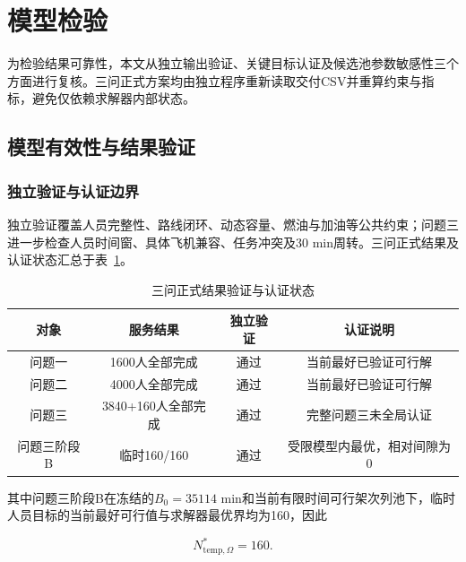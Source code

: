 
\section{模型检验}\label{sec:validation}

为检验结果可靠性，本文从独立输出验证、关键目标认证及候选池参数敏感性三个方面进行复核。三问正式方案均由独立程序重新读取交付CSV并重算约束与指标，避免仅依赖求解器内部状态。

\subsection{模型有效性与结果验证}\label{subsec:validation-results}

\subsubsection{独立验证与认证边界}

独立验证覆盖人员完整性、路线闭环、动态容量、燃油与加油等公共约束；问题三进一步检查人员时间窗、具体飞机兼容、任务冲突及30 min周转。三问正式结果及认证状态汇总于表~\ref{tab:validation-summary}。

\begin{table}[htbp]
\centering
\caption{三问正式结果验证与认证状态}
\label{tab:validation-summary}
\small
\begin{tabular}{c c c c}
\toprule
对象 & 服务结果 & 独立验证 & 认证说明\\
\midrule
问题一 & 1600人全部完成 & 通过 & 当前最好已验证可行解\\
问题二 & 4000人全部完成 & 通过 & 当前最好已验证可行解\\
问题三 & 3840+160人全部完成 & 通过 & 完整问题三未全局认证\\
问题三阶段B & 临时160/160 & 通过 & 受限模型内最优，相对间隙为0\\
\bottomrule
\end{tabular}
\end{table}

其中问题三阶段B在冻结的$B_0=35114$ min和当前有限时间可行架次列池下，临时人员目标的当前最好可行值与求解器最优界均为160，因此

\[
N_{\mathrm{temp},\Omega}^{*}=160.
\tag{9-1}\label{eq:q3-stageb-certification}
\]

